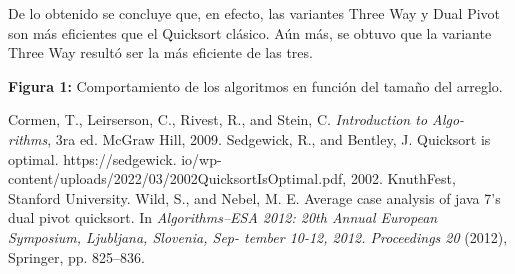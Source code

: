 \documentclass{article}
\begin{document}
	De lo obtenido se concluye que, en efecto, las variantes Three Way y Dual Pivot son m\'as eficientes que el Quicksort cl\'asico. A\'un m\'as, se obtuvo que la variante Three Way result\'o ser la m\'as eficiente de las tres. 
        \begin{center}
        \end{center}
        \begin{center}
            \caption{\textbf{Figura 1:} Comportamiento de los algoritmos en funci\'on del tamaño del arreglo.}
        \end{center}
	\begin{thebibliography}{}
		 Cormen, T., Leirserson, C., Rivest, R., and Stein, C. \textit{Introduction to Algo-
		rithms}, 3ra ed. McGraw Hill, 2009.
		 Sedgewick, R., and Bentley, J. Quicksort is optimal. https://sedgewick.
		io/wp-content/uploads/2022/03/2002QuicksortIsOptimal.pdf, 2002. KnuthFest,
		Stanford University.
		 Wild, S., and Nebel, M. E. Average case analysis of java 7’s dual pivot quicksort.
		In \textit{Algorithms–ESA 2012: 20th Annual European Symposium, Ljubljana, Slovenia, Sep-
		tember 10-12, 2012. Proceedings 20} (2012), Springer, pp. 825–836.
	\end{thebibliography}
	
\end{document}

